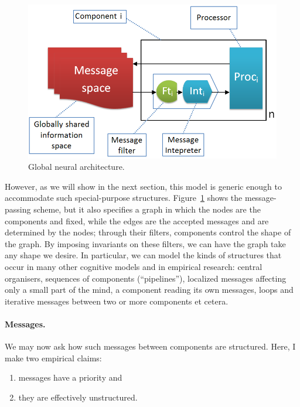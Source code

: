 %
\begin{figure}[!h]
	\centering
	\includegraphics[width=400pt]{Figs/global.png}
	\caption{Global neural architecture.}
	\label{fig:global}
\end{figure}

However, as we will show in the next section, this model is generic enough to accommodate such special-purpose structures. Figure~\ref{fig:global} shows the message-passing scheme, but it also specifies a graph in which the nodes are the components and fixed, while the edges are the accepted messages and are determined by the nodes; through their filters, components control the shape of the graph. By imposing invariants on these filters, we can have the graph take any shape we desire. In particular, we can model the kinds of structures that occur in many other cognitive models and in empirical research: central organisers, sequences of components (``pipelines''), localized messages affecting only a small part of the mind, a component reading its own messages, loops and iterative messages between two or more components et cetera.

\pagebreak

\paragraph{Messages.}

We may now ask how such messages between components are structured. Here, I make two empirical claims:
\begin{enumerate}
	\item messages have a priority and
	\item they are effectively unstructured.
\end{enumerate}

